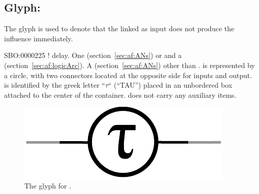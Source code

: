 
\subsection{Glyph: }\label{sec:delay}

The glyph  is used to denote that the  linked as input does not produce the influence immediately.

\begin{glyphDescription}
 \glyphSboTerm SBO:0000225 ! delay.
 \glyphOrigin One  (section~\ref{sec:af:ANs}) or and a  (section~\ref{sec:af:logicArc}).
 \glyphTarget A  (section~\ref{sec:af:ANs}) other than .
 \glyphContainer {} is represented by a circle, with two connectors located at the opposite side for inputs and output.
 \glyphLabel {} is identified by the greek letter ``$\tau$`` (``TAU'') placed in an unbordered box attached to the center of the container.
 \glyphAux {} does not carry any auxiliary items.
\end{glyphDescription}

\begin{figure}[H]
  \centering
  \includegraphics[scale = 0.5]{images/delay}
  \caption{The \AF glyph for .}
  \label{fig:delay}
\end{figure}
\normalcolor
